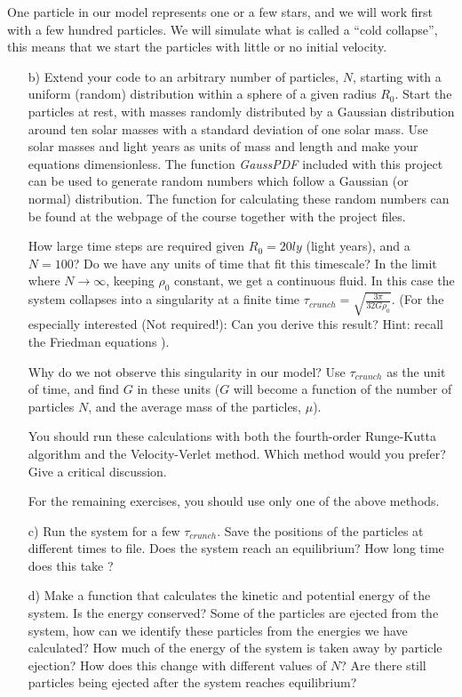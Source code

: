 \documentclass[11pt,a4wide]{article}
\begin{document}
One particle in our model represents one or a few stars, and we will
work first with a few hundred particles. We will simulate what is called a
``cold collapse'', this means that we start the particles with little
or no initial velocity.
\begin{enumerate}
\item[b)] Extend your code to an arbitrary number of particles, $N$,
  starting with a uniform (random) distribution within a sphere of a
  given radius $R_0$. Start the particles at rest, with masses
  randomly distributed by a Gaussian distribution around ten solar
  masses with a standard deviation of one solar mass. Use solar masses
  and light years as units of mass and length and make your equations dimensionless.
The function {\em GaussPDF} included with this project can be used to generate 
random numbers which follow a Gaussian (or normal) distribution.  The function for calculating these random numbers can be found at the webpage of the course together with the project files.

How large time steps are required given $R_0 = 20 ly$
(light years), and a $N = 100$? Do we have any units of time that fit
this timescale?   
In the limit where $N \rightarrow \infty$, keeping $\rho_0$ constant,
we get a continuous fluid. In this case the system collapses into a
singularity at a finite time $\tau_{crunch} = \sqrt{\frac{3\pi}{32G\rho_0}}$. 
(For the especially interested (Not required!): Can
you derive this result? Hint: recall the Friedman equations \cite{friedmaneqs}).

Why do we not observe this singularity in our model? Use
$\tau_{crunch}$ as the unit of time, and find $G$ in these units ($G$
will become a function of the number of particles $N$, and the average
mass of the particles, $\mu$).

You should run these calculations with both the fourth-order Runge-Kutta algorithm
and the Velocity-Verlet method. Which method would you prefer? Give a critical discussion.

For the remaining exercises, you should use only one of the above methods. 

\item[c)] Run the system for a few $\tau_{crunch}$. Save the positions
  of the particles at different times to file. Does the system
  reach an equilibrium? How long time does this take ?

\item[d)] Make a function that calculates the kinetic and potential
  energy of the system. Is the energy conserved? Some of the
  particles are ejected from the system, how can we identify these
  particles from the energies we have calculated? How much of the
  energy of the system is taken away by particle ejection? How does
  this change with different values of $N$? Are there still particles
  being ejected after the system reaches equilibrium?



\end{enumerate}
\end{document}
